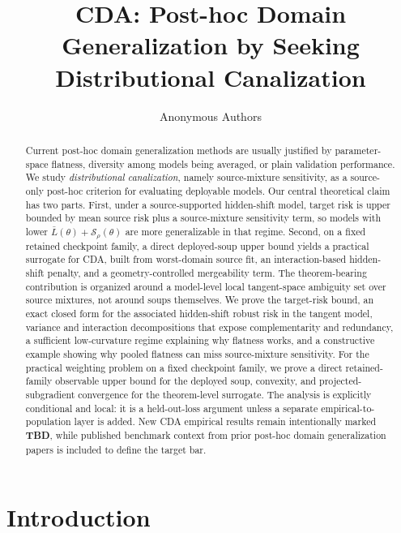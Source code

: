 \documentclass{article}
\title{CDA: Post-hoc Domain Generalization by Seeking Distributional Canalization}
\author{Anonymous Authors}
\theoremstyle{definition}
\newcommand{\TBD}{\textbf{TBD}}
\newcommand{\cda}{\textup{\textsc{CDA}}}
\begin{document}
\maketitle

\begin{abstract}
Current post-hoc domain generalization methods are usually justified by parameter-space flatness, diversity among models being averaged, or plain validation performance. We study \emph{distributional canalization}, namely source-mixture sensitivity, as a source-only post-hoc criterion for evaluating deployable models. Our central theoretical claim has two parts. First, under a source-supported hidden-shift model, target risk is upper bounded by mean source risk plus a source-mixture sensitivity term, so models with lower \(\bar L(\theta)+\mathcal S_\rho(\theta)\) are more generalizable in that regime. Second, on a fixed retained checkpoint family, a direct deployed-soup upper bound yields a practical surrogate for \cda{}, built from worst-domain source fit, an interaction-based hidden-shift penalty, and a geometry-controlled mergeability term. The theorem-bearing contribution is organized around a model-level local tangent-space ambiguity set over source mixtures, not around soups themselves. We prove the target-risk bound, an exact closed form for the associated hidden-shift robust risk in the tangent model, variance and interaction decompositions that expose complementarity and redundancy, a sufficient low-curvature regime explaining why flatness works, and a constructive example showing why pooled flatness can miss source-mixture sensitivity. For the practical weighting problem on a fixed checkpoint family, we prove a direct retained-family observable upper bound for the deployed soup, convexity, and projected-subgradient convergence for the theorem-level surrogate. The analysis is explicitly conditional and local: it is a held-out-loss argument unless a separate empirical-to-population layer is added. New \cda{} empirical results remain intentionally marked \TBD{}, while published benchmark context from prior post-hoc domain generalization papers is included to define the target bar.
\end{abstract}

\section{Introduction}
\end{document}
